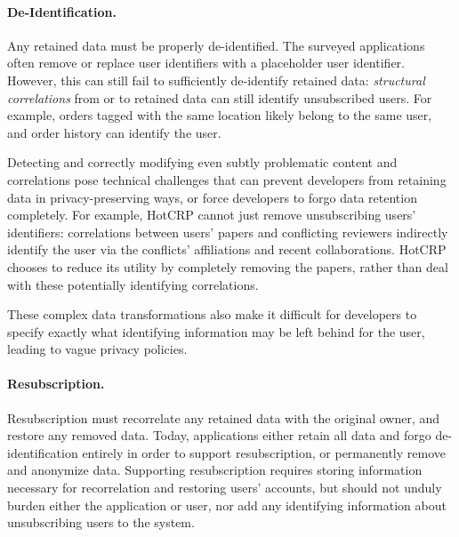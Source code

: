 \paragraph{De-Identification.}
Any retained data must be properly de-identified. The surveyed applications often remove or replace
user identifiers with a placeholder user identifier. However, this can still fail to sufficiently
de-identify retained data: \emph{structural correlations} from or to retained data can still identify
unsubscribed users. For example, orders tagged with the same location likely belong to the same
user, and order history can identify the user. 

Detecting and correctly modifying even subtly problematic content and correlations pose technical
challenges that can prevent developers from retaining data in privacy-preserving ways, or force
developers to forgo data retention completely.  For example, HotCRP cannot just remove unsubscribing
users' identifiers: correlations between users' papers and conflicting reviewers indirectly identify
the user via the conflicts' affiliations and recent collaborations.  HotCRP chooses to reduce its
utility by completely removing the papers, rather than deal with these potentially identifying
correlations.

These complex data transformations also make it difficult for developers to specify exactly 
what identifying information may be left behind for the user, leading to vague privacy policies.

\paragraph{Resubscription.}
Resubscription must recorrelate any retained data with the original owner, and restore any removed
data. Today, applications either retain all data and forgo de-identification entirely in order to
support resubscription, or permanently remove and anonymize data.
Supporting resubscription requires storing information necessary for recorrelation and restoring
users' accounts, but should not unduly burden either the application or user, nor add any
identifying information about unsubscribing users to the system.

%

